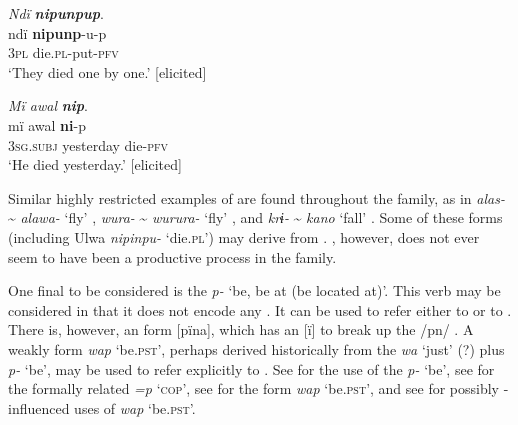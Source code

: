 \ea%
    \label{ex:verbs:14}
          \textit{Ndï} \textbf{\textit{nipunpup}}.\\
\gll ndï  \textbf{nipunp}{}-u-p\\
    3\textsc{pl}  die.\textsc{pl}{}-put-\textsc{pfv}\\
\glt `They died one by one.’ [elicited]
\z

\ea%
    \label{ex:verbs:15}
          \textit{Mï awal} \textbf{\textit{nip}}.\\
\gll mï      awal    \textbf{ni}{}-p\\
    3\textsc{sg.subj}  yesterday  die-\textsc{pfv}\\
\glt `He died yesterday.’ [elicited]
\z

\z

Similar highly restricted examples of  are found throughout the  family, as in  \textit{alas-} {\textasciitilde} \textit{alawa-} ‘fly’ \citep[124]{Barlow2020b},  \textit{wura-} {\textasciitilde} \textit{wurura-} ‘fly’ \citep[78]{Barlow2020a}, and  \textit{krɨ-} {\textasciitilde} \textit{kano} ‘fall’ \citep[70]{Barlow2021}. Some of these forms (including Ulwa \textit{nipinpu-} ‘die.\textsc{pl}’) may derive from  . , however, does not ever seem to have been a productive  process in the family.

  One final  to be considered is the  \textit{p-} ‘be, be at (be located at)’. This verb may be considered  in that it does not encode any . It can be used to refer either to  or to  . There is, however, an  form [pïna], which has an  [ï] to break up the /pn/ . A weakly  form \textit{wap} ‘be.\textsc{pst}’, perhaps derived historically from the  \textit{wa} ‘just’ (?) plus \textit{p-} ‘be’, may be used to refer explicitly to  . See  for the use of the  \textit{p-} ‘be’, see  for the formally related  \textit{=p} ‘\textsc{cop}’, see  for the form \textit{wap} ‘be.\textsc{pst}’, and see  for possibly -influenced uses of \textit{wap} ‘be.\textsc{pst}’.


